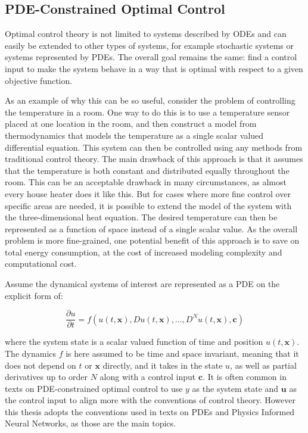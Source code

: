 \subsection{PDE-Constrained Optimal Control}

Optimal control theory is not limited to systems described by ODEs and can easily be extended to other types of systems, for example stochastic systems or systems represented by PDEs. The overall goal remains the same: find a control input to make the system behave in a way that is optimal with respect to a given objective function.

As an example of why this can be so useful, consider the problem of controlling the temperature in a room. One way to do this is to use a temperature sensor placed at one location in the room, and then construct a model from thermodynamics that models the temperature as a single scalar valued differential equation. This system can then be controlled using any methods from traditional control theory. The main drawback of this approach is that it assumes that the temperature is both constant and distributed equally throughout the room. This can be an acceptable drawback in many circumstances, as almost every house heater does it like this. But for cases where more fine control over specific areas are needed, it is possible to extend the model of the system with the three-dimensional heat equation. The desired temperature can then be represented as a function of space instead of a single scalar value. As the overall problem is more fine-grained, one potential benefit of this approach is to save on total energy consumption, at the cost of increased modeling complexity and computational cost.

Assume the dynamical systems of interest are represented as a PDE on the explicit form of:

\begin{equation}
    \frac{\partial u}{\partial t} = f(u(t, \bm{x}), D u(t, \bm{x}), \dots, D^N u(t, \bm{x}), \bm{c})
    \label{eq:controlledpde}
\end{equation}

\noindent where the system state is a scalar valued function of time and position $u(t, \bm{x})$. The dynamics $f$ is here assumed to be time and space invariant, meaning that it does not depend on $t$ or $\bm{x}$ directly, and it takes in the state $u$, as well as partial derivatives up to order $N$ along with a control input $\bm{c}$. It is often common in texts on PDE-constrained optimal control to use $y$ as the system state and $\bm{u}$ as the control input to align more with the conventions of control theory. However this thesis adopts the conventions used in texts on PDEs and Physics Informed Neural Networks, as those are the main topics.

